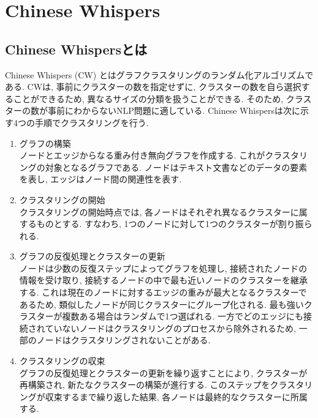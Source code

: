 
\section{Chinese Whispers}
\subsection{Chinese Whispersとは}
Chinese Whispers (CW) \cite{chinese-whispers}とはグラフクラスタリングのランダム化アルゴリズムである. CWは, 事前にクラスターの数を指定せずに, クラスターの数を自ら選択することができるため, 異なるサイズの分類を扱うことができる. そのため, クラスターの数が事前にわからないNLP問題に適している. 
Chinese Whispersは次に示す4つの手順でクラスタリングを行う. 

\begin{enumerate}
  \item グラフの構築\\
  ノードとエッジからなる重み付き無向グラフを作成する. これがクラスタリングの対象となるグラフである. ノードはテキスト文書などのデータの要素を表し, エッジはノード間の関連性を表す. \\
  
  \item クラスタリングの開始\\
  クラスタリングの開始時点では, 各ノードはそれぞれ異なるクラスターに属するものとする. すなわち, 1つのノードに対して1つのクラスターが割り振られる. \\
  
  \item グラフの反復処理とクラスターの更新\\
  ノードは少数の反復ステップによってグラフを処理し, 接続されたノードの情報を受け取り, 接続するノードの中で最も近いノードのクラスターを継承する. これは現在のノードに対するエッジの重みが最大となるクラスターであるため, 類似したノードが同じクラスターにグループ化される. 
  最も強いクラスターが複数ある場合はランダムで1つ選ばれる. 一方でどのエッジにも接続されていないノードはクラスタリングのプロセスから除外されるため, 一部のノードはクラスタリングされないことがある. \\
  
  \item クラスタリングの収束\\
  グラフの反復処理とクラスターの更新を繰り返すことにより, クラスターが再構築され, 新たなクラスターの構築が進行する. このステップをクラスタリングが収束するまで繰り返した結果, 各ノードは最終的なクラスターに所属する. 
\end{enumerate}